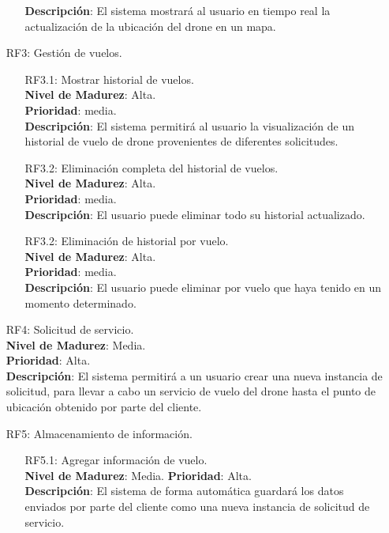 \begin{itemize}
\begin{itemize}
			\textbf{Descripción}: El sistema mostrará al usuario en 
			tiempo real la actualización de la ubicación del drone 
			en un mapa.
	\end{itemize}
	\item[RF3:] Gestión de vuelos.
	\begin{itemize}
		\item[RF3.1:] Mostrar historial de vuelos. \\
			\textbf{Nivel de Madurez}: Alta. \\
			\textbf{Prioridad}: media. \\
			\textbf{Descripción}: El sistema permitirá al usuario la 
			visualización de un historial de vuelo de drone 
			provenientes de diferentes solicitudes.
		\item[RF3.2:] Eliminación completa del historial de vuelos. \\
			\textbf{Nivel de Madurez}: Alta. \\
			\textbf{Prioridad}: media. \\
			\textbf{Descripción}: El usuario puede eliminar todo su 
			historial actualizado.
		\item[RF3.2:] Eliminación de historial por vuelo. \\
			\textbf{Nivel de Madurez}: Alta. \\
			\textbf{Prioridad}: media. \\
			\textbf{Descripción}: El usuario puede eliminar por 
			vuelo que haya tenido en un momento determinado.
	\end{itemize}
	\item[RF4:] Solicitud de servicio. \\
		\textbf{Nivel de Madurez}: Media. \\
		\textbf{Prioridad}: Alta. \\
		\textbf{Descripción}: El sistema permitirá a un usuario crear 
		una nueva instancia de solicitud, para llevar a cabo un servicio 
		de vuelo del drone hasta el punto de ubicación obtenido por 
		parte del cliente.
	\item[RF5:] Almacenamiento de información.
	\begin{itemize}
		\item[RF5.1:] Agregar información de vuelo. \\
			\textbf{Nivel de Madurez}: Media.
			\textbf{Prioridad}: Alta. \\
			\textbf{Descripción}: El sistema de forma automática 
			guardará los datos enviados por parte del cliente como 
			una nueva instancia de solicitud de servicio.

\end{itemize}
\end{itemize}
